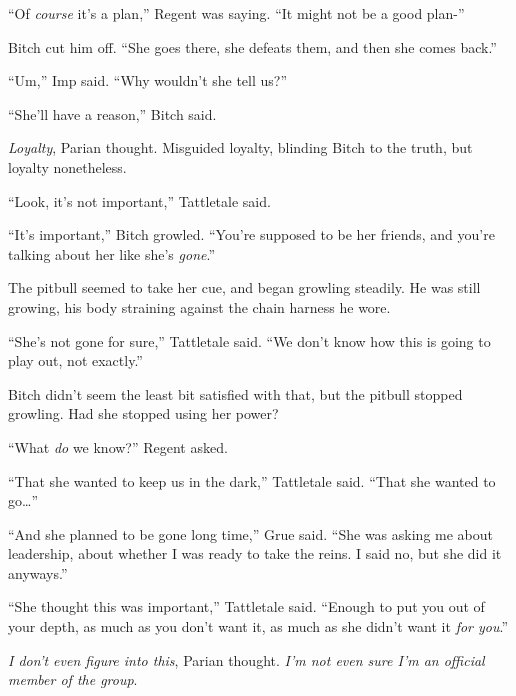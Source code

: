 ``Of \emph{course} it's a plan,'' Regent was saying.  ``It might not be a good plan-''



Bitch cut him off.  ``She goes there, she defeats them, and then she comes back.''



``Um,'' Imp said.  ``Why wouldn't she tell us?''



``She'll have a reason,'' Bitch said.



\emph{Loyalty}, Parian thought.  Misguided loyalty, blinding Bitch to the truth, but loyalty nonetheless.



``Look, it's not important,'' Tattletale said.



``It's important,'' Bitch growled.  ``You're supposed to be her friends, and you're talking about her like she's \emph{gone}.''



The pitbull seemed to take her cue, and began growling steadily.  He was still growing, his body straining against the chain harness he wore.



``She's not gone for sure,'' Tattletale said.  ``We don't know how this is going to play out, not exactly.''



Bitch didn't seem the least bit satisfied with that, but the pitbull stopped growling.  Had she stopped using her power?



``What \emph{do} we know?'' Regent asked.



``That she wanted to keep us in the dark,'' Tattletale said.  ``That she wanted to go\ldots''



``And she planned to be gone long time,'' Grue said.  ``She was asking me about leadership, about whether I was ready to take the reins.  I said no, but she did it anyways.''



``She thought this was important,'' Tattletale said.  ``Enough to put you out of your depth, as much as you don't want it, as much as she didn't want it \emph{for you}.''



\emph{I don't even figure into this}, Parian thought.  \emph{I'm not even sure I'm an official member of the group}.




